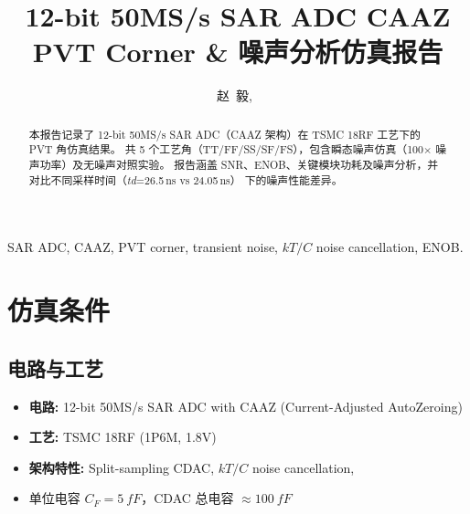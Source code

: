 \documentclass[journal]{IEEEtran}
\begin{document}
\title{12-bit 50MS/s SAR ADC CAAZ \\ PVT Corner \& 噪声分析仿真报告}

\author{
  赵~毅,~
}


\maketitle

\begin{abstract}
本报告记录了 12-bit 50MS/s SAR ADC（CAAZ 架构）在 TSMC 18RF 工艺下的 PVT 角仿真结果。
共 5 个工艺角（TT/FF/SS/SF/FS），包含瞬态噪声仿真（100$\times$ 噪声功率）及无噪声对照实验。
报告涵盖 SNR、ENOB、关键模块功耗及噪声分析，并对比不同采样时间（\emph{td}=26.5\,ns vs 24.05\,ns）
下的噪声性能差异。
\end{abstract}

\begin{IEEEkeywords}
SAR ADC, CAAZ, PVT corner, transient noise, $kT/C$ noise cancellation, ENOB.
\end{IEEEkeywords}

\section{仿真条件}
\label{sec:conditions}

\subsection{电路与工艺}
\begin{itemize}
  \item \textbf{电路:} 12-bit 50MS/s SAR ADC with CAAZ (Current-Adjusted AutoZeroing)
  \item \textbf{工艺:} TSMC 18RF (1P6M, 1.8V)
  \item \textbf{架构特性:} Split-sampling CDAC, $kT/C$ noise cancellation,
  \item {} 单位电容 $C_F = \SI{5}{fF}$，CDAC 总电容 $\approx \SI{100}{fF}$
\end{itemize}
\end{document}
